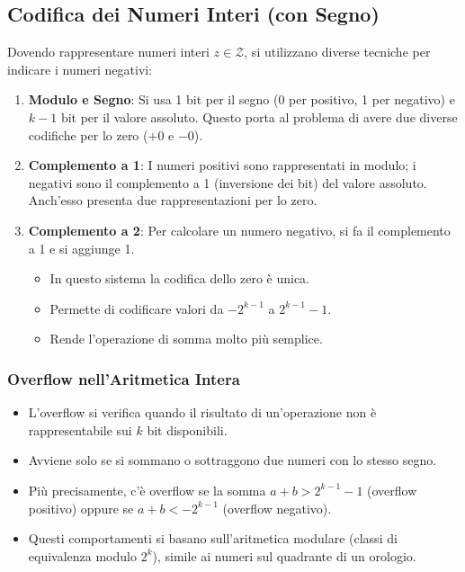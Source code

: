 \documentclass[12pt, a4paper]{article}
\begin{document}
\subsection{Codifica dei Numeri Interi (con Segno)}

Dovendo rappresentare numeri interi $z \in \mathcal{Z}$, si utilizzano diverse tecniche per indicare i numeri negativi: 

\begin{enumerate}
    \item \textbf{Modulo e Segno}: Si usa 1 bit per il segno (0 per positivo, 1 per negativo) e $k-1$ bit per il valore assoluto. Questo porta al problema di avere due diverse codifiche per lo zero ($+0$ e $-0$). 
    \item \textbf{Complemento a 1}: I numeri positivi sono rappresentati in modulo; i negativi sono il complemento a 1 (inversione dei bit) del valore assoluto. Anch'esso presenta due rappresentazioni per lo zero. 
    \item \textbf{Complemento a 2}: Per calcolare un numero negativo, si fa il complemento a 1 e si aggiunge 1. 
    \begin{itemize}
        \item In questo sistema la codifica dello zero è unica. 
        \item Permette di codificare valori da $-2^{k-1}$ a $2^{k-1} - 1$. 
        \item Rende l'operazione di somma molto più semplice. 
    \end{itemize}
\end{enumerate}

\subsubsection*{Overflow nell'Aritmetica Intera}
\begin{itemize}
    \item L'overflow si verifica quando il risultato di un'operazione non è rappresentabile sui $k$ bit disponibili. 
    \item Avviene solo se si sommano o sottraggono due numeri con lo stesso segno. 
    \item Più precisamente, c'è overflow se la somma $a+b > 2^{k-1} - 1$ (overflow positivo) oppure se $a+b < -2^{k-1}$ (overflow negativo). 
    \item Questi comportamenti si basano sull'aritmetica modulare (classi di equivalenza modulo $2^k$), simile ai numeri sul quadrante di un orologio. 
\end{itemize}
\end{document}
